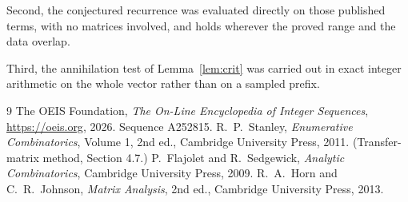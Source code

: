 \documentclass[11pt,a4paper]{article}
\theoremstyle{plain}
\theoremstyle{definition}
\begin{document}
Second, the conjectured recurrence was evaluated directly on those published terms, with no
matrices involved, and holds wherever the proved range and the data overlap.

Third, the annihilation test of Lemma~\ref{lem:crit} was carried out in exact integer
arithmetic on the whole vector rather than on a sampled prefix.

\begin{thebibliography}{9}
 The OEIS Foundation, \emph{The On-Line Encyclopedia of Integer
Sequences}, \url{https://oeis.org}, 2026. Sequence A252815.
 R.~P.~Stanley, \emph{Enumerative Combinatorics}, Volume 1, 2nd ed.,
Cambridge University Press, 2011. (Transfer-matrix method, Section 4.7.)
 P.~Flajolet and R.~Sedgewick, \emph{Analytic Combinatorics}, Cambridge
University Press, 2009.
 R.~A.~Horn and C.~R.~Johnson, \emph{Matrix Analysis}, 2nd ed., Cambridge
University Press, 2013.
\end{thebibliography}
\end{document}
